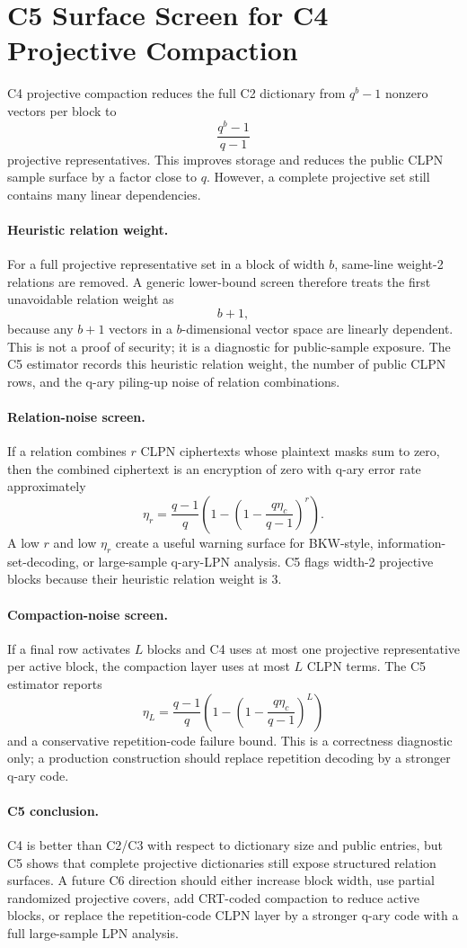 \section{C5 Surface Screen for C4 Projective Compaction}
\label{app:c5-surface}

C4 projective compaction reduces the full C2 dictionary from $q^b-1$ nonzero vectors per block to
\[
  \frac{q^b-1}{q-1}
\]
projective representatives.  This improves storage and reduces the public CLPN sample surface by a factor close to $q$.  However, a complete projective set still contains many linear dependencies.

\paragraph{Heuristic relation weight.}
For a full projective representative set in a block of width $b$, same-line weight-2 relations are removed.  A generic lower-bound screen therefore treats the first unavoidable relation weight as
\[
  b+1,
\]
because any $b+1$ vectors in a $b$-dimensional vector space are linearly dependent.  This is not a proof of security; it is a diagnostic for public-sample exposure.  The C5 estimator records this heuristic relation weight, the number of public CLPN rows, and the q-ary piling-up noise of relation combinations.

\paragraph{Relation-noise screen.}
If a relation combines $r$ CLPN ciphertexts whose plaintext masks sum to zero, then the combined ciphertext is an encryption of zero with q-ary error rate approximately
\[
  \eta_r=\frac{q-1}{q}\left(1-\left(1-\frac{q\eta_c}{q-1}\right)^r\right).
\]
A low $r$ and low $\eta_r$ create a useful warning surface for BKW-style, information-set-decoding, or large-sample q-ary-LPN analysis.  C5 flags width-2 projective blocks because their heuristic relation weight is $3$.

\paragraph{Compaction-noise screen.}
If a final row activates $L$ blocks and C4 uses at most one projective representative per active block, the compaction layer uses at most $L$ CLPN terms.  The C5 estimator reports
\[
  \eta_L=\frac{q-1}{q}\left(1-\left(1-\frac{q\eta_c}{q-1}\right)^L\right)
\]
and a conservative repetition-code failure bound.  This is a correctness diagnostic only; a production construction should replace repetition decoding by a stronger q-ary code.

\paragraph{C5 conclusion.}
C4 is better than C2/C3 with respect to dictionary size and public entries, but C5 shows that complete projective dictionaries still expose structured relation surfaces.  A future C6 direction should either increase block width, use partial randomized projective covers, add CRT-coded compaction to reduce active blocks, or replace the repetition-code CLPN layer by a stronger q-ary code with a full large-sample LPN analysis.
